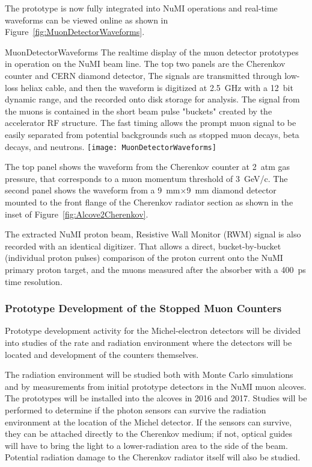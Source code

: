 The prototype is now fully integrated into NuMI operations and
real-time waveforms can be viewed online as shown in
Figure~\ref{fig:MuonDetectorWaveforms}.
\begin{cdrfigure}{MuonDetectorWaveforms}
{The realtime display of the muon detector prototypes in operation
on the NuMI beam line. The top two panels are the Cherenkov counter
and CERN diamond detector\cite{ref:CERNdiamond}, The signals are
transmitted through low-loss heliax cable, and then the waveform
is digitized at 2.5~GHz with a 12~bit dynamic range, and the
recorded onto disk storage for analysis. The signal from the
muons is contained in the short beam pulse "buckets" created
by the accelerator RF structure. The fast timing allows the
prompt muon signal to be easily separated from potential backgrounds
such as stopped muon decays, beta decays, and neutrons.}
\texttt{[image: MuonDetectorWaveforms]}
\end{cdrfigure}
The top panel shows the waveform from the Cherenkov counter at 2~atm
gas pressure, that corresponds to a muon momentum threshold of
3~GeV/c. The second panel shows the waveform from a 9~mm$\times$9~mm
diamond detector mounted to the front flange of the Cherenkov radiator
section as shown in the inset of Figure~\ref{fig:Alcove2Cherenkov}.

The extracted NuMI proton beam, Resistive Wall Monitor (RWM) signal is
also recorded with an identical digitizer. That allows a direct,
bucket-by-bucket (individual proton pulses) comparison of the proton
current onto the NuMI primary proton target, and the muons measured
after the absorber with a 400~ps time resolution.

\subsubsection{Prototype Development of the Stopped Muon Counters}

Prototype development activity for the Michel-electron detectors will
be divided into studies of the rate and radiation environment where
the detectors will be located and development of the counters
themselves.

The radiation environment will be studied both with Monte Carlo
simulations and by measurements from initial prototype detectors
in the NuMI muon alcoves\cite{ref:NuMIBeamMonitors}.
The prototypes will be installed into the alcoves in 2016 and 2017.
Studies will be performed to determine if the photon sensors
can survive the radiation environment at the location of the Michel
detector. If the sensors can survive, they can be attached directly to
the Cherenkov medium; if not, optical guides will have to bring the
light to a lower-radiation area to the side of the beam. Potential
radiation damage to the Cherenkov radiator itself will also be
studied.


